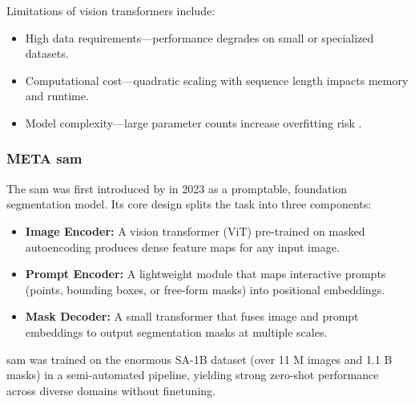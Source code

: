 Limitations of vision transformers include:
\begin{itemize}

    \item High data requirements—performance degrades on small or specialized datasets.  
    \item Computational cost—quadratic scaling with sequence length impacts memory and runtime.  
    \item Model complexity—large parameter counts increase overfitting risk \cite{lee_enhancing_mamba_s6_2024}.
\end{itemize}


\subsubsection{META \acrlong{sam}}
\label{ssec:meta_sam2}
The \acrfull{sam} was first introduced by \textcite{kirillov_segment_2023} in 2023 as a promptable, foundation segmentation model. Its core design splits the task into three components:
\begin{itemize}
    \item \textbf{Image Encoder:} A vision transformer (ViT) pre-trained on masked autoencoding produces dense feature maps for any input image.
    \item \textbf{Prompt Encoder:} A lightweight module that maps interactive prompts (points, bounding boxes, or free-form masks) into positional embeddings.
    \item \textbf{Mask Decoder:} A small transformer that fuses image and prompt embeddings to output segmentation masks at multiple scales.
\end{itemize}
\acrshort{sam} was trained on the enormous SA-1B dataset (over 11 M images and 1.1 B masks) in a semi-automated pipeline, yielding strong zero-shot performance across diverse domains without finetuning.

